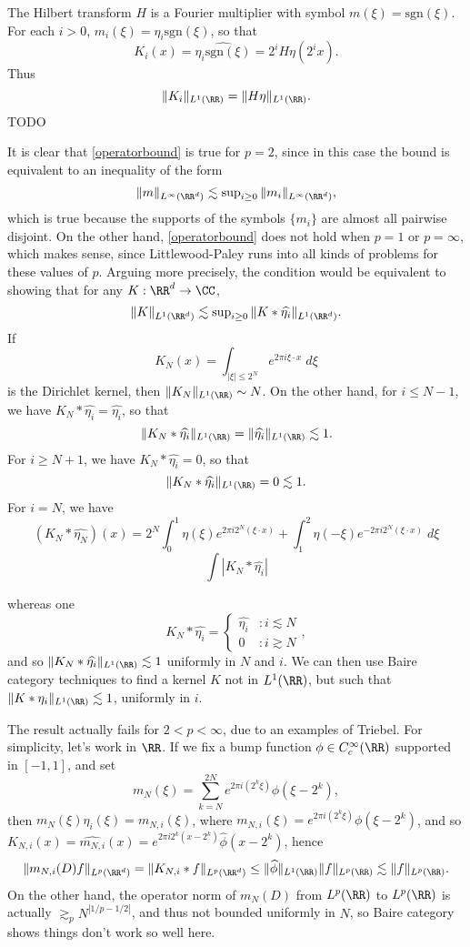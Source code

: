 The Hilbert transform $H$ is a Fourier multiplier with symbol $m(\xi) = \text{sgn}(\xi)$. For each $i > 0$, $m_i(\xi) = \eta_i \text{sgn}(\xi)$, so that
%
\[ K_i(x) = \widehat{\eta_i \text{sgn}(\xi)} = 2^i H \eta(2^i x). \]
%
Thus
%
\[ \| K_i \|_{L^1(\RR)} = \| H \eta \|_{L^1(\RR)}. \]
%
TODO

It is clear that \eqref{operatorbound} is true for $p = 2$, since in this case the bound is equivalent to an inequality of the form
%
\[ \| m \|_{L^\infty(\RR^d)} \lesssim \sup\nolimits_{i \geq 0} \| m_i \|_{L^\infty(\RR^d)}, \]
%
which is true because the supports of the symbols $\{ m_i \}$ are almost all pairwise disjoint. On the other hand, \eqref{operatorbound} does not hold when $p = 1$ or $p = \infty$, which makes sense, since Littlewood-Paley runs into all kinds of problems for these values of $p$. Arguing more precisely, the condition would be equivalent to showing that for any $K: \RR^d \to \CC$,
%
\[ \| K \|_{L^1(\RR^d)} \lesssim \sup\nolimits_{i \geq 0} \| K * \widehat{\eta_i} \|_{L^1(\RR^d)}. \]
%
If
%
\[ K_N(x) = \int_{|\xi| \leq 2^N} e^{2 \pi i \xi \cdot x}\; d\xi \]
%
is the Dirichlet kernel, then $\| K_N \|_{L^1(\RR)} \sim N$. On the other hand, for $i \leq N-1$, we have $K_N * \widehat{\eta_i} = \widehat{\eta_i}$, so that
%
\[ \| K_N * \widehat{\eta_i} \|_{L^1(\RR)} = \| \widehat{\eta_i} \|_{L^1(\RR)} \lesssim 1. \]
%
For $i \geq N+1$, we have $K_N * \widehat{\eta_i} = 0$, so that
%
\[ \| K_N * \widehat{\eta_i} \|_{L^1(\RR)} = 0 \lesssim 1. \]
%
For $i = N$, we have
%
\[ (K_N * \widehat{\eta_N})(x) = 2^N \int_0^1 \eta(\xi) e^{2 \pi i 2^N (\xi \cdot x)} + \int_1^2 \eta(-\xi) e^{-2 \pi i 2^N (\xi \cdot x)}\; d\xi  \]
%
\[ \int |K_N * \widehat{\eta_i}| \]

whereas one
% 
%
\[ K_N * \widehat{\eta_i} = \begin{cases} \widehat{\eta_i} &: i \lesssim N \\ 0 &: i \gtrsim N \end{cases}, \]
%
and so $\| K_N * \widehat{\eta_i} \|_{L^1(\RR)} \lesssim 1$ uniformly in $N$ and $i$. We can then use Baire category techniques to find a kernel $K$ not in $L^1(\RR)$, but such that $\| K * \eta_i \|_{L^1(\RR)} \lesssim 1$, uniformly in $i$.

The result actually fails for $2 < p < \infty$, due to an examples of Triebel. For simplicity, let's work in $\RR$. If we fix a bump function $\phi \in C_c^\infty(\RR)$ supported in $[-1,1]$, and set
%
\[ m_N(\xi) = \sum_{k = N}^{2N} e^{2 \pi i (2^k \xi)} \phi(\xi - 2^k), \]
%
then $m_N(\xi) \eta_i(\xi) = m_{N,i}(\xi)$, where $m_{N,i}(\xi) = e^{2 \pi i (2^k \xi)} \phi(\xi - 2^k)$, and so $K_{N,i}(x) = \widehat{m_{N,i}}(x) = e^{2 \pi i 2^k(x - 2^k)} \widehat{\phi}(x - 2^k)$, hence
%
\[ \| m_{N,i}(D) f \|_{L^p(\RR^d)} = \| K_{N,i} * f \|_{L^p(\RR^d)} \leq \| \widehat{\phi} \|_{L^1(\RR)} \| f \|_{L^p(\RR)} \lesssim \| f \|_{L^p(\RR)}. \]
%
On the other hand, the operator norm of $m_N(D)$ from $L^p(\RR)$ to $L^p(\RR)$ is actually $\gtrsim_p N^{|1/p - 1/2|}$, and thus not bounded uniformly in $N$, so Baire category shows things don't work so well here.

